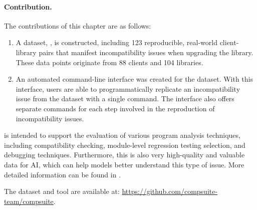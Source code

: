 \paragraph{Contribution.}
The contributions of this chapter are as follows:%
\begin{enumerate}[leftmargin=*,topsep=2pt]
\item A dataset, \toolcompsuite, is constructed, including 123
  reproducible, real-world client-library pairs that manifest
  incompatibility issues when upgrading the library. These data points
  originate from 88 clients and 104 libraries.
\item An automated command-line interface was created for the dataset.
With this interface, users are able to programmatically replicate an incompatibility issue
from the dataset with a single command.
The interface also offers separate commands for each step involved in the reproduction of
incompatibility issues.
\end{enumerate}



\toolcompsuite is intended to support the evaluation of various program analysis techniques, including
compatibility checking, module-level regression testing selection, and debugging techniques.
Furthermore, this is also very high-quality and valuable data for AI, which can help models better understand this type of issue.
More detailed information can be found in .

The dataset and tool are available at: \url{https://github.com/compsuite-team/compsuite}.

